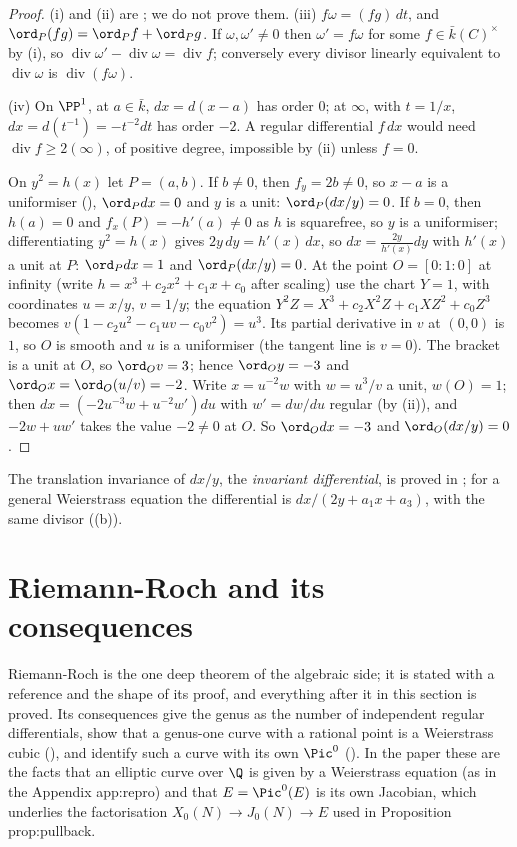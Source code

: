 \begin{proof}
(i) and (ii) are \cite[Chapter II, Propositions 4.2 and 4.3]{SilvermanAEC}; we do not prove them. (iii) $f\omega=(fg)\,dt$, and $\ord_P(fg)=\ord_Pf+\ord_Pg$.
If $\omega,\omega'\ne0$ then $\omega'=f\omega$ for some $f\in\bar k(C)^\times$ by (i), so $\operatorname{div}\omega'-\operatorname{div}\omega=\operatorname{div}f$; conversely every divisor
linearly equivalent to $\operatorname{div}\omega$ is $\operatorname{div}(f\omega)$.

(iv) On $\PP^1$, at $a\in\bar k$, $dx=d(x-a)$ has order $0$; at $\infty$, with $t=1/x$, $dx=d(t^{-1})=-t^{-2}dt$ has order $-2$. A regular differential
$f\,dx$ would need $\operatorname{div}f\ge2(\infty)$, of positive degree, impossible by (ii) unless $f=0$.

On $y^2=h(x)$ let $P=(a,b)$. If $b\ne0$, then $f_y=2b\ne0$, so $x-a$ is a uniformiser (), $\ord_Pdx=0$ and $y$ is a unit:
$\ord_P(dx/y)=0$. If $b=0$, then $h(a)=0$ and $f_x(P)=-h'(a)\ne0$ as $h$ is squarefree, so $y$ is a uniformiser; differentiating $y^2=h(x)$ gives
$2y\,dy=h'(x)\,dx$, so $dx=\frac{2y}{h'(x)}dy$ with $h'(x)$ a unit at $P$: $\ord_Pdx=1$ and $\ord_P(dx/y)=0$. At the point $O=[0:1:0]$ at infinity
(write $h=x^3+c_2x^2+c_1x+c_0$ after scaling) use the chart $Y=1$, with coordinates $u=x/y$, $v=1/y$; the equation $Y^2Z=X^3+c_2X^2Z+c_1XZ^2+c_0Z^3$
becomes $v(1-c_2u^2-c_1uv-c_0v^2)=u^3$. Its partial derivative in $v$ at $(0,0)$ is $1$, so $O$ is smooth and $u$ is a uniformiser (the tangent line
is $v=0$). The bracket is a unit at $O$, so $\ord_Ov=3$; hence $\ord_Oy=-3$ and $\ord_Ox=\ord_O(u/v)=-2$. Write $x=u^{-2}w$ with $w=u^3/v$ a unit,
$w(O)=1$; then $dx=(-2u^{-3}w+u^{-2}w')du$ with $w'=dw/du$ regular (by (ii)), and $-2w+uw'$ takes the value $-2\ne0$ at $O$. So $\ord_Odx=-3$ and
$\ord_O(dx/y)=0$.
\end{proof}

The translation invariance of $dx/y$, the \emph{invariant differential}, is proved in ; for a general Weierstrass equation the
differential is $dx/(2y+a_1x+a_3)$, with the same divisor ((b)).

\section{Riemann-Roch and its consequences}\label{sec:curves:riemann-roch}

Riemann-Roch is the one deep theorem of the algebraic side; it is stated with a reference and the shape of its proof, and everything after
it in this section is proved. Its consequences give the genus as the number of independent regular differentials, show that a genus-one curve
with a rational point is a Weierstrass cubic (), and identify such a curve with its own $\Pic^0$
(). In the paper these are the facts that an elliptic curve over $\Q$ is given by a Weierstrass equation (as in the
Appendix app:repro) and that $E=\Pic^0(E)$ is its own Jacobian, which underlies the factorisation $X_0(N)\to J_0(N)\to E$ used in Proposition prop:pullback.

